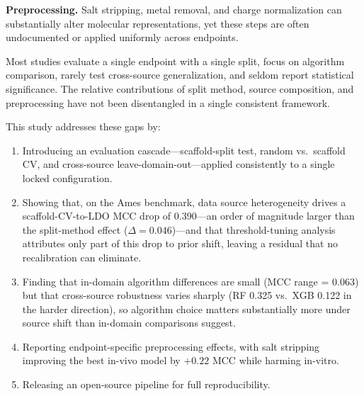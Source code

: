 \textbf{Preprocessing.} Salt stripping, metal removal, and charge normalization can 
substantially alter molecular representations,\cite{Fourches_2010,Fourches_2016} yet these 
steps are often undocumented or applied uniformly across endpoints.

Most studies evaluate a single endpoint with a single split, focus on algorithm 
comparison,\cite{Yang_2019,Mayr_2016} rarely test cross-source generalization, and seldom 
report statistical significance.\cite{Demsar_2006} The relative contributions of split 
method, source composition, and preprocessing have not been disentangled in a single 
consistent framework.

This study addresses these gaps by:
\begin{enumerate}
    \item Introducing an evaluation cascade---scaffold-split test, random vs.\ scaffold CV, 
    and cross-source leave-domain-out---applied consistently to a single locked 
    configuration.

    \item Showing that, on the Ames benchmark, data source heterogeneity drives a 
    scaffold-CV-to-LDO MCC drop of 0.390---an order of magnitude larger than the split-method 
    effect ($\Delta = 0.046$)---and that threshold-tuning analysis attributes only part of 
    this drop to prior shift, leaving a residual that no recalibration can eliminate.

    \item Finding that in-domain algorithm differences are small (MCC range = 0.063) but 
    that cross-source robustness varies sharply (RF 0.325 vs.\ XGB 0.122 in the harder 
    direction), so algorithm choice matters substantially more under source shift than 
    in-domain comparisons suggest.

    \item Reporting endpoint-specific preprocessing effects, with salt stripping improving 
    the best in-vivo model by $+0.22$ MCC while harming in-vitro.

    \item Releasing an open-source pipeline for full reproducibility.
\end{enumerate}
